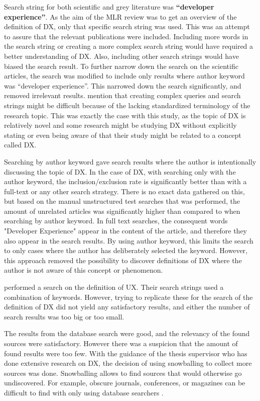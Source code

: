 \documentclass[english, 12pt, a4paper, sci, utf8, a-1b, online]{aaltothesis}
\newcounter{subsubsubsection}[subsubsection]
\begin{document}
Search string for both scientific and grey literature was \textbf{``developer experience''}. As the aim of the MLR review was to get an overview of the definition of DX, only that specific search string was used. This was an attempt to assure that the relevant publications were included. Including more words in the search string or creating a more complex search string would have required a better understanding of DX. Also, including other search strings would have biased the search result. To further narrow down the search on the scientific articles, the search was modified to include only results where author keyword was ``developer experience''. This narrowed down the search significantly, and removed irrelevant results. \textcite{guidelines-for-snowballing} mention that creating complex queries and search strings might be difficult because of the lacking standardized terminology of the research topic. This was exactly the case with this study, as the topic of DX is relatively novel and some research might be studying DX without explicitly stating or even being aware of that their study might be related to a concept called DX.

Searching by author keyword gave search results where the author is intentionally discussing the topic of DX. In the case of DX, with searching only with the author keyword, the inclusion/exclusion rate is significantly better than with a full-text or any other search strategy. There is no exact data gathered on this, but based on the manual unstructured test searches that was performed, the amount of unrelated articles was significantly higher than compared to when searching by author keyword. In full text searches, the consequent words "Developer Experience" appear in the content of the article, and therefore they also appear in the search results. By using author keyword, this limits the search to only cases where the author has deliberately selected the keyword. However, this approach removed the possibility to discover definitions of DX where the author is not aware of this concept or phenomenon.

\textcite{understanding-ux} performed a search on the definition of UX. Their search strings used a combination of keywords. However, trying to replicate these for the search of the definition of DX did not yield any satisfactory results, and either the number of search results was too big or too small.


The results from the database search were good, and the relevancy of the found sources were satisfactory. However there was a suspicion that the amount of found results were too few. With the guidance of the thesis supervisor who has done extensive research on DX, the decision of using snowballing to collect more sources was done. Snowballing allows to find sources that would otherwise go undiscovered. For example, obscure journals, conferences, or magazines can be difficult to find with only using database searchers \parencite{guidelines-for-snowballing}.
\end{document}
